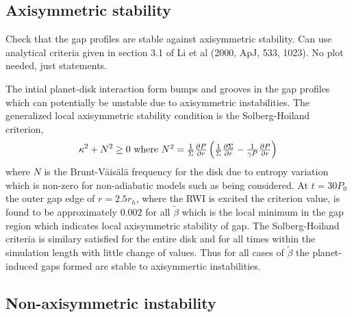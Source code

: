 {\bf
\subsection{Axisymmetric stability}
Check that the gap profiles are stable against axisymmetric
stability. Can use analytical criteria given in section 3.1 of Li et
al (2000, ApJ, 533, 1023). No plot needed, just statements. 
}

The intial planet-disk interaction form bumps and grooves in the gap profiles
 which can potentially be unstable due to axisymmetric instabilities. The
 generalized local axisymmetric stability condition is the Solberg-Hoiland
 criterion,
\begin{equation}
 \kappa^2+N^2 \geq 0 $ where $ N^2=\frac{1}{\Sigma} \frac{\partial P}{\partial r} \left(\frac{1}{\Sigma} \frac{\partial \Sigma}{\partial r}-\frac{1}{\gamma P} \frac{\partial P}{\partial r}  \right)
\end{equation}
where $N$ is the Brunt-V\"ais\"al\"a frequency for the disk due to entropy
 variation which is non-zero for non-adiabatic models such as being considered.
 At  $t=30P_0$ the outer gap edge of $r=2.5r_h$,  where the RWI is excited the
 criterion value, is found to be approximately $0.002$ for all $\tilde\beta$
 which is the local minimum in the gap region which indicates local
 axisymmetric stability of gap. The Solberg-Hoiland criteria is similary
 satisfied for the entire disk and for all times within the simulation length
 with little change of values. Thus for all cases of $\tilde\beta$ the
 planet-induced gaps formed are stable to axisymmertic instabilities.

\subsection{Non-axisymmetric instability}\label{linear}

